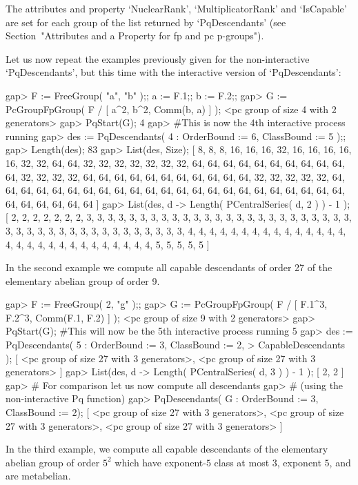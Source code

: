The  attributes  and  property  `NuclearRank',  `MultiplicatorRank'   and
`IsCapable'  are  set  for  each  group   of   the   list   returned   by
`PqDescendants' (see Section~"Attributes and a Property  for  fp  and  pc
p-groups").

Let us now repeat the examples previously given for  the  non-interactive
`PqDescendants',  but  this  time  with  the   interactive   version   of
`PqDescendants':

\beginexample
gap> F := FreeGroup( "a", "b" );; a := F.1;; b := F.2;;
gap> G := PcGroupFpGroup( F / [ a^2, b^2, Comm(b, a) ] );
<pc group of size 4 with 2 generators>
gap> PqStart(G);
4
gap> #This is now the 4th interactive process running
gap> des := PqDescendants( 4 : OrderBound := 6, ClassBound := 5 );;
gap> Length(des);
83
gap> List(des, Size);
[ 8, 8, 8, 16, 16, 16, 32, 16, 16, 16, 16, 16, 32, 32, 64, 64, 32, 32, 32, 
  32, 32, 32, 32, 64, 64, 64, 64, 64, 64, 64, 64, 64, 64, 64, 32, 32, 32, 32, 
  64, 64, 64, 64, 64, 64, 64, 64, 64, 64, 64, 32, 32, 32, 32, 32, 64, 64, 64, 
  64, 64, 64, 64, 64, 64, 64, 64, 64, 64, 64, 64, 64, 64, 64, 64, 64, 64, 64, 
  64, 64, 64, 64, 64, 64, 64 ]
gap> List(des, d -> Length( PCentralSeries( d, 2 ) ) - 1 );
[ 2, 2, 2, 2, 2, 2, 2, 3, 3, 3, 3, 3, 3, 3, 3, 3, 3, 3, 3, 3, 3, 3, 3, 3, 3, 
  3, 3, 3, 3, 3, 3, 3, 3, 3, 3, 3, 3, 3, 3, 3, 3, 3, 3, 3, 3, 3, 3, 3, 3, 4, 
  4, 4, 4, 4, 4, 4, 4, 4, 4, 4, 4, 4, 4, 4, 4, 4, 4, 4, 4, 4, 4, 4, 4, 4, 4, 
  4, 4, 4, 5, 5, 5, 5, 5 ]
\endexample

In the second example we compute all  capable descendants of order  27 of
the  elementary abelian group of order 9.  

\beginexample
gap> F := FreeGroup( 2, "g" );;                                 
gap> G := PcGroupFpGroup( F / [ F.1^3, F.2^3, Comm(F.1, F.2) ] );
<pc group of size 9 with 2 generators>
gap> PqStart(G); #This will now be the 5th interactive process running
5
gap> des := PqDescendants( 5 : OrderBound := 3, ClassBound := 2,
>                              CapableDescendants );
[ <pc group of size 27 with 3 generators>, 
  <pc group of size 27 with 3 generators> ]
gap> List(des, d -> Length( PCentralSeries( d, 3 ) ) - 1 );
[ 2, 2 ]
gap> # For comparison let us now compute all descendants
gap> # (using the non-interactive Pq function)
gap> PqDescendants( G : OrderBound := 3, ClassBound := 2);
[ <pc group of size 27 with 3 generators>, 
  <pc group of size 27 with 3 generators>, 
  <pc group of size 27 with 3 generators> ]
\endexample

In  the  third  example,  we  compute  all  capable  descendants  of  the
elementary abelian group of order  $5^2$ which have exponent-$5$ class at
most $3$, exponent $5$, and are metabelian.

